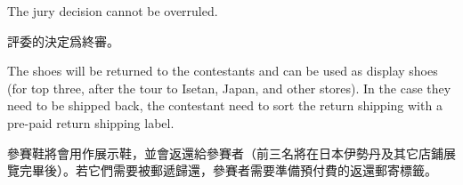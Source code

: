 \begin{paracol}{2}
        The jury decision cannot be overruled.

        \vspace{1em}

        \switchcolumn
        評委的決定爲終審。
        \switchcolumn*

        The shoes will be returned to the contestants and can be used as display shoes (for top three, after the tour to Isetan, Japan, and other stores). In the case they need to be shipped back, the contestant need to sort the return shipping with a pre-paid return shipping label.

        \switchcolumn
        參賽鞋將會用作展示鞋，並會返還給參賽者（前三名將在日本伊勢丹及其它店鋪展覽完畢後）。若它們需要被郵遞歸還，參賽者需要準備預付費的返還郵寄標籤。
        \switchcolumn*

    \egroup

\end{paracol}

\theendnotes

